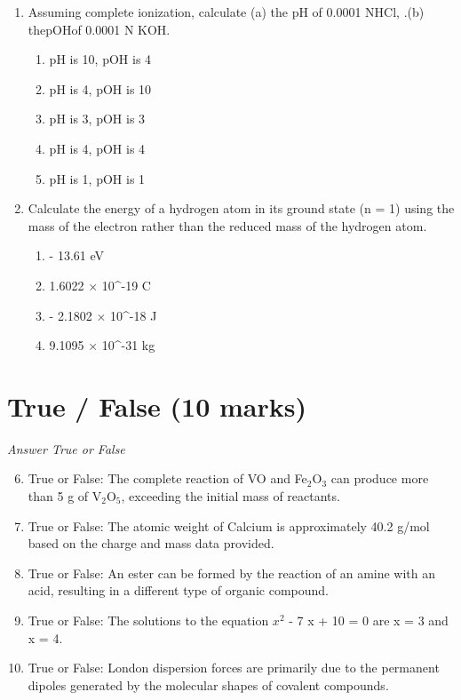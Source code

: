 \documentclass[12pt]{article}
\begin{document}
\begin{enumerate}[label=\arabic*.]
\item Assuming complete ionization, calculate (a) the pH of 0.0001 NHCl, .(b) thepOHof 0.0001 N KOH.
\begin{enumerate}[label=(\alph*)]
    \item pH is 10, pOH is 4
    \item pH is 4, pOH is 10
    \item pH is 3, pOH is 3
    \item pH is 4, pOH is 4
    \item pH is 1, pOH is 1
\end{enumerate}
\item Calculate the energy of a hydrogen atom in its ground state (n = 1) using the mass of the electron rather than the reduced mass of the hydrogen atom.
\begin{enumerate}[label=(\alph*)]
    \item - 13.61 eV
    \item 1.6022 \ensuremath{\times} 10^-19 C
    \item - 2.1802 \ensuremath{\times} 10^-18 J
    \item 9.1095 \ensuremath{\times} 10^-31 kg
\end{enumerate}
\end{enumerate}

\section*{True / False (10 marks)}
\textit{Answer True or False}
\begin{enumerate}[label=\arabic*.]
\setcounter{enumi}{5}
\item True or False: The complete reaction of VO and Fe$_{2}$O$_{3}$ can produce more than 5 g of V$_{2}$O$_{5}$, exceeding the initial mass of reactants.
\item True or False: The atomic weight of Calcium is approximately 40.2 g/mol based on the charge and mass data provided.
\item True or False: An ester can be formed by the reaction of an amine with an acid, resulting in a different type of organic compound.
\item True or False: The solutions to the equation $x^2$ - 7 x + 10 = 0 are x = 3 and x = 4.
\item True or False: London dispersion forces are primarily due to the permanent dipoles generated by the molecular shapes of covalent compounds.
\end{enumerate}
\end{document}
